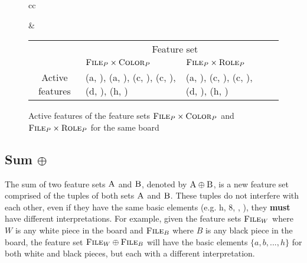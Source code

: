 \begin{figure}[h]
\centering
\label{fig:active_features}

\begin{tabular}{cc}
\raisebox{-7ex}{
\chessboard[
    tinyboard,
    showmover=false,
    hlabel=false,
    setwhite={kc3, nc2, pa2, Pd4},
    addblack={Kc8,bh7, pa7}
]
}

&

\begin{tabular}{|c|p{4cm}|p{4cm}|p{0cm}}
\cline{2-3}
\multicolumn{1}{c|}{} & \multicolumn{2}{c|}{\centering Feature set} \\
\cline{2-3}
\multicolumn{1}{c|}{} & \centering $\textsc{File}_{P} \times \textsc{Color}_{P}$ & \centering $\textsc{File}_{P} \times \textsc{Role}_{P}$ & \\
\cline{1-3}
Active features &
(a, \white), (a, \black), (c, \black), (c, \white), (d, \white), (h, \black) &
(a, \sympawn), (c, \symking), (c, \symknight), (d, \sympawn), (h, \symbishop) \\
\cline{1-3}
\end{tabular}

\end{tabular}

\caption{Active features of the feature sets $\textsc{File}_{P} \times \textsc{Color}_{P}$ and $\textsc{File}_{P} \times \textsc{Role}_{P}$ for the same board}
\end{figure}


\subsection{Sum $\oplus$}


The sum of two feature sets $\textsc{A}$ and $\textsc{B}$, denoted by $\textsc{A} \oplus \textsc{B}$, is a new feature set comprised of the tuples of both sets $\textsc{A}$ and $\textsc{B}$. These tuples do not interfere with each other, even if they have the same basic elements (e.g. h, 8, \symrook, \black), they \textbf{must} have different interpretations.
For example, given the feature sets $\textsc{File}_{W}$ where $W$ is any white piece in the board and $\textsc{File}_{B}$ where $B$ is any black piece in the board, the feature set $\textsc{File}_{W} \oplus \textsc{File}_{B}$ will have the basic elements $\{a, b, ..., h\}$ for both white and black pieces, but each with a different interpretation.

